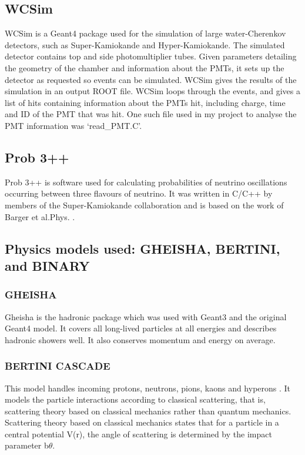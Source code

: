 \documentclass[11pt,oneside,a4paper]{article}
\begin{document}
\subsection{WCSim}
WCSim is a Geant4 package used for the simulation of large water-Cherenkov detectors, such as Super-Kamiokande and Hyper-Kamiokande. The simulated detector contains top and side photomultiplier tubes. Given parameters detailing the geometry of the chamber and information about the PMTs, it sets up the detector as requested so events can be simulated. WCSim gives the results of the simulation in an output ROOT file. WCSim loops through the events, and gives a list of hits containing information about the PMTs hit, including charge, time and ID of the PMT that was hit. One such file used in my project to analyse the PMT information was `read{\_}PMT.C'.

\subsection{Prob 3++}
Prob 3++ is software used for calculating probabilities of neutrino oscillations occurring between three flavours of neutrino. It was written in C/C++ by members of the Super-Kamiokande collaboration and is based on the work of Barger et al.Phys. \cite{prob3++}.


\subsection{Physics models used: GHEISHA, BERTINI, and BINARY}

\subsubsection{GHEISHA}

Gheisha is the hadronic package which was used with Geant3 and the original Geant4 model. It covers all long-lived particles at all energies and describes hadronic showers well. It also conserves momentum and energy on average.

\subsubsection{BERTINI CASCADE}
This model handles incoming protons, neutrons, pions, kaons and hyperons \cite{modelspaper}. It models the particle interactions according to classical scattering, that is, scattering theory based on classical mechanics rather than quantum mechanics. Scattering theory based on classical mechanics states that for a particle in a central potential V(r), the angle of scattering is determined by the impact parameter b$\theta$. 
\end{document}
